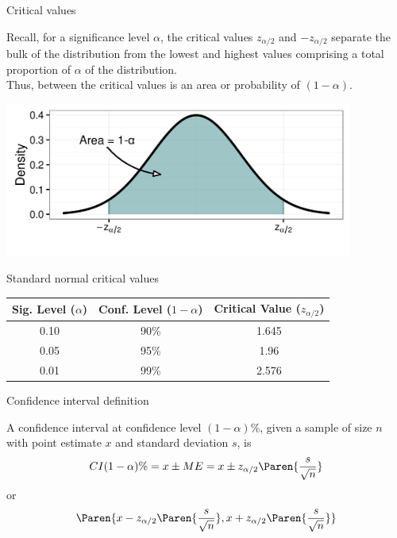 \documentclass[xcolor=table, handout]{beamer}
\begin{document}
\begin{frame}{Critical values}
\begin{block}{}
\large
Recall, for a significance level $\alpha$, the critical values $z_{\alpha/2}$ and $-z_{\alpha/2}$ separate the bulk of the distribution from the lowest and highest values comprising a total proportion of $\alpha$ of the distribution.\\
\medskip
Thus, between the critical values is an area or probability of $(1-\alpha)$. 
\end{block}
\medskip
{\centering
\includegraphics[width=4.5in]{../images/ch7_crit_values}
\par}
\end{frame}

\begin{frame}{Standard normal critical values}
\begin{block}{}
\large
{\centering
\begin{tabular}{c | c | c }
Sig. Level ($\alpha$) & Conf. Level ($1-\alpha$)  & Critical Value ($z_{\alpha/2}$)\\
\hline
0.10 & 90\% &  1.645\\
0.05 & 95\% & 1.96 \\
0.01 & 99\% & 2.576
\end{tabular}
\par}
\end{block}
\end{frame}

\begin{frame}{Confidence interval definition}

\begin{block}{}
\large
A confidence interval at confidence level $(1-\alpha)$\%, given a sample of size $n$ with point estimate $x$ and standard deviation $s$, is
\[CI (1-\alpha)\% = x \pm ME = x \pm z_{\alpha/2}\Paren{\frac s {\sqrt n}}\]
or
\[\Paren{x - z_{\alpha/2}\Paren{\frac s {\sqrt n}}, x + z_{\alpha/2}\Paren{\frac s {\sqrt n}} }\]
\end{block}

\end{frame}
\end{document}
